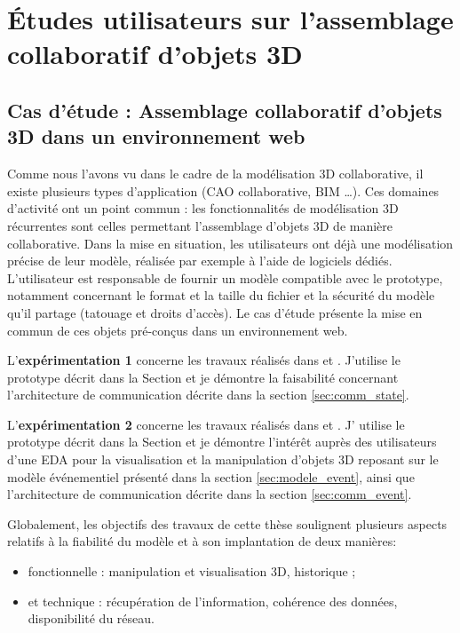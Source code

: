 \chapter{Études utilisateurs sur l'assemblage collaboratif 
d'objets 3D}
\chaptertable

\section{Cas d'étude : Assemblage collaboratif d'objets 3D dans un 
environnement web}
\label{sec:use_case}
Comme nous l'avons vu dans le cadre de la modélisation \gls{3D} collaborative, il existe plusieurs types 
d'application (\gls{CAO} collaborative, \gls{BIM} \dots). 
Ces domaines d'activité ont un point commun : les fonctionnalités de 
modélisation \gls{3D} récurrentes sont celles permettant l'assemblage d'objets 
\gls{3D} de manière collaborative. Dans la mise en situation, les utilisateurs ont déjà une 
modélisation précise de leur modèle,  
réalisée par exemple à l'aide de logiciels dédiés. L'utilisateur est responsable de fournir un 
modèle compatible avec le prototype, notamment concernant le format et la taille 
du fichier et la sécurité du modèle qu'il partage (tatouage et droits d'accès). Le cas d'étude 
présente la mise en commun de ces objets pré-conçus dans un environnement 
web.

L'\textbf{expérimentation 1} concerne les travaux réalisés dans 
\cite{Desprat2015a} 
et \cite{Desprat2015b}. J'utilise le prototype décrit dans la Section  et je démontre la faisabilité concernant l'architecture 
de communication décrite dans la section \ref{sec:comm_state}. 

 
L'\textbf{expérimentation 2} concerne les travaux réalisés dans 
\cite{Desprat2016} et 
\cite{Desprat2017}. J' utilise le prototype décrit dans la Section  
et je démontre l'intérêt auprès des utilisateurs d'une \gls{EDA} pour la 
visualisation et la manipulation d'objets \gls{3D} reposant sur le modèle 
événementiel présenté dans la section \ref{sec:modele_event}, ainsi que l'architecture de 
communication décrite dans la section \ref{sec:comm_event}.

Globalement, les objectifs des travaux de cette thèse soulignent plusieurs aspects relatifs à la fiabilité 
du modèle et à son implantation de deux manières: 
\begin{itemize}
	\item fonctionnelle : manipulation et visualisation 
	3D, historique ;
	\item et technique : récupération de l'information, cohérence des 
	données, disponibilité du réseau.
\end{itemize}

